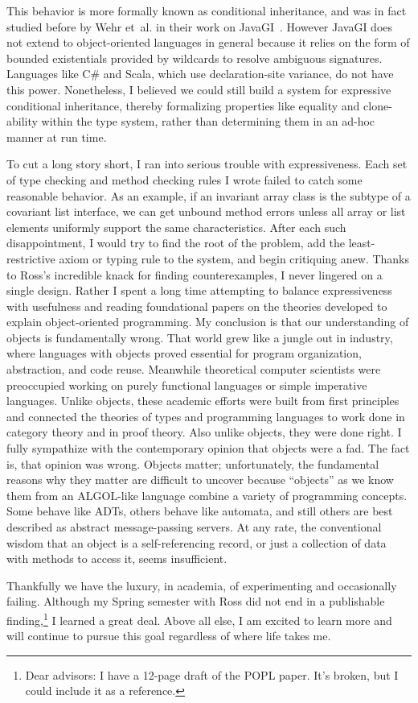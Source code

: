 \documentclass{article}
\begin{document}
This behavior is more formally known as conditional inheritance, and was in fact studied before by Wehr et~al. in their work on JavaGI~\cite{javagi}.
However JavaGI does not extend to object-oriented languages in general because it relies on the form of bounded existentials provided by wildcards to resolve ambiguous signatures.
Languages like C\# and Scala, which use declaration-site variance, do not have this power.
Nonetheless, I believed we could still build a system for expressive conditional inheritance, thereby formalizing properties like equality and clone-ability within the type system, rather than determining them in an ad-hoc manner at run time.

To cut a long story short, I ran into serious trouble with expressiveness.
Each set of type checking and method checking rules I wrote failed to catch some reasonable behavior.
As an example, if an invariant array class is the subtype of a covariant list interface, we can get unbound method errors unless all array or list elements uniformly support the same characteristics.
After each such disappointment, I would try to find the root of the problem, add the least-restrictive axiom or typing rule to the system, and begin critiquing anew.
Thanks to Ross's incredible knack for finding counterexamples, I never lingered on a single design.
Rather I spent a long time attempting to balance expressiveness with usefulness and reading foundational papers on the theories developed to explain object-oriented programming.
My conclusion is that our understanding of objects is fundamentally wrong.
That world grew like a jungle out in industry, where languages with objects proved essential for program organization, abstraction, and code reuse.
Meanwhile theoretical computer scientists were preoccupied working on purely functional languages or simple imperative languages.
Unlike objects, these academic efforts were built from first principles and connected the theories of types and programming languages to work done in category theory and in proof theory.
Also unlike objects, they were done right.
I fully sympathize with the contemporary opinion that objects were a fad.
The fact is, that opinion was wrong.
Objects matter; unfortunately, the fundamental reasons why they matter are difficult to uncover because ``objects'' as we know them from an ALGOL-like language combine a variety of programming concepts.
Some behave like ADTs, others behave like automata, and still others are best described as abstract message-passing servers.
At any rate, the conventional wisdom that an object is a self-referencing record, or just a collection of data with methods to access it, seems insufficient.

Thankfully we have the luxury, in academia, of experimenting and occasionally failing.
Although my Spring semester with Ross did not end in a publishable finding,\footnote{Dear advisors: I have a 12-page draft of the POPL paper. It's broken, but I could include it as a reference.} I learned a great deal.
Above all else, I am excited to learn more and will continue to pursue this goal regardless of where life takes me.



\end{document}
